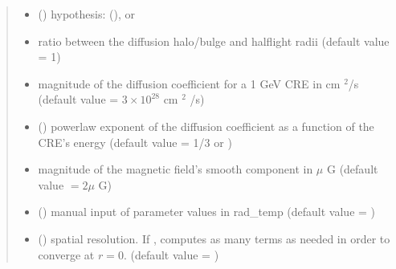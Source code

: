 \documentclass[letterpaper,10pt,english]{sphinxmanual}
\begin{document}
\begin{fulllineitems}
\begin{quote}
\begin{description}
\begin{itemize}
\item {} 
\sphinxAtStartPar
{} () \textendash{} hypothesis:  (),  or 

\item {} 
\sphinxAtStartPar
{} \textendash{} ratio between the diffusion halo/bulge and half\sphinxhyphen{}light radii (default value = 1)

\item {} 
\sphinxAtStartPar
{} \textendash{} magnitude of the diffusion coefficient for a 1 GeV CRE in cm \({}^2\)/s (default value = \(3\times 10^{28}\) cm \({}^2\) /s)

\item {} 
\sphinxAtStartPar
{} (\sphinxstyleliteralemphasis{\sphinxupquote{, }}) \textendash{} power\sphinxhyphen{}law exponent of the diffusion coefficient as a function of the CRE’s energy (default value = 1/3 or )

\item {} 
\sphinxAtStartPar
{} \textendash{} magnitude of the magnetic field’s smooth component in \(\mu\) G (default value \(= 2 \mu\) G)

\item {} 
\sphinxAtStartPar
{} () \textendash{} manual input of parameter values in rad\_temp (default value = )

\item {} 
\sphinxAtStartPar
{} () \textendash{} spatial resolution. If , {\hyperref[\detokenize{diffsph:diffsph.pyflux.synch_emissivity}]{}} computes as many terms as needed in order to converge at \(r=0\). (default value = )


\end{itemize}
\end{description}
\end{quote}
\end{fulllineitems}
\end{document}
